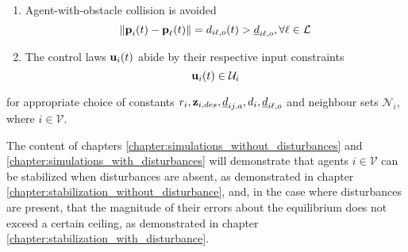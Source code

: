 \begin{problem}
\begin{enumerate}
  \item Agent-with-obstacle collision is avoided
    $$ \|\bm{\mathbf{p}}_i(t) - \bm{\mathbf{p}}_{\ell}(t)\| = d_{i\ell,o} (t) > \underline{d}_{i\ell,o},
    \forall \ell \in \mathcal{L}$$

  \item The control laws $\bm{\mathbf{u}}_i(t)$ abide by their respective input constraints
    $$\bm{\mathbf{u}}_i(t) \in \mathcal{U}_i$$
\end{enumerate}

for appropriate choice of constants
$r_i,\bm{\mathbf{z}}_{i,des},\underline{d}_{ij,a}, d_i,\underline{d}_{i\ell,o}$ and
neighbour sets $\mathcal{N}_i$, where $i \in \mathcal{V}$.
\end{problem}

The content of chapters \ref{chapter:simulations_without_disturbances} and
\ref{chapter:simulations_with_disturbances} will demonstrate that agents
$i \in \mathcal{V}$ can be stabilized when disturbances are absent, as
demonstrated in chapter \ref{chapter:stabilization_without_disturbance}, and,
in the case where disturbances are present, that the magnitude of their errors
about the equilibrium does not exceed a certain ceiling, as demonstrated in
chapter \ref{chapter:stabilization_with_disturbance}.
